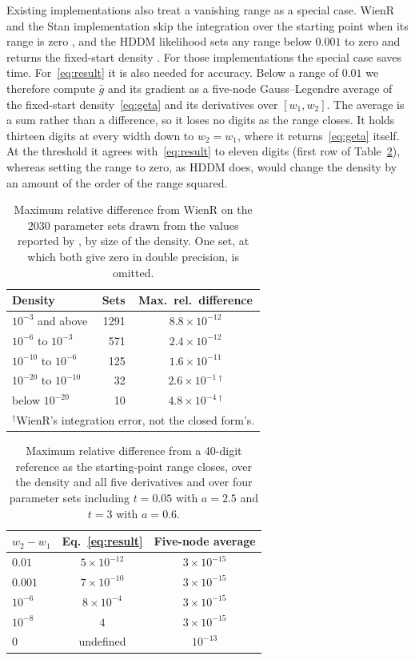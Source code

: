 \documentclass[final,5p,times,twocolumn,authoryear]{elsarticle}
\newcommand{\gbar}{\bar{g}}
\begin{document}
Existing implementations also treat a vanishing range as a special case. WienR and the Stan implementation skip the integration over the starting point when its range is zero \citep{HartmannKlauer2021, Henrich2024}, and the HDDM likelihood sets any range below $0.001$ to zero and returns the fixed-start density \citep{hddmwfpt}. For those implementations the special case saves time. For~\eqref{eq:result} it is also needed for accuracy. Below a range of $0.01$ we therefore compute $\gbar$ and its gradient as a five-node Gauss--Legendre average of the fixed-start density~\eqref{eq:geta} and its derivatives over $[w_1, w_2]$. The average is a sum rather than a difference, so it loses no digits as the range closes. It holds thirteen digits at every width down to $w_2 = w_1$, where it returns~\eqref{eq:geta} itself. At the threshold it agrees with~\eqref{eq:result} to eleven digits (first row of Table~\ref{tab:width}), whereas setting the range to zero, as HDDM does, would change the density by an amount of the order of the range squared.
\begin{table}[t]
\centering
\caption{Maximum relative difference from WienR on the 2030 parameter sets drawn from the values reported by \citet{tran2021systematic}, by size of the density. One set, at which both give zero in double precision, is omitted.}
\label{tab:bins}
\begin{tabular}{lrc}
\toprule
Density & Sets & Max.\ rel.\ difference \\
\midrule
$10^{-3}$ and above      & 1291 & $8.8\times10^{-12}$ \\
$10^{-6}$ to $10^{-3}$   &  571 & $2.4\times10^{-12}$ \\
$10^{-10}$ to $10^{-6}$  &  125 & $1.6\times10^{-11}$ \\
$10^{-20}$ to $10^{-10}$ &   32 & $2.6\times10^{-1}\,^{\dagger}$ \\
below $10^{-20}$         &   10 & $4.8\times10^{-4}\,^{\dagger}$ \\
\bottomrule
\multicolumn{3}{l}{$^{\dagger}$WienR's integration error, not the closed form's.}
\end{tabular}
\end{table}

\begin{table}[t]
\centering
\caption{Maximum relative difference from a 40-digit reference as the starting-point range closes, over the density and all five derivatives and over four parameter sets including $t = 0.05$ with $a = 2.5$ and $t = 3$ with $a = 0.6$.}
\label{tab:width}
\begin{tabular}{lcc}
\toprule
$w_2 - w_1$ & Eq.~\eqref{eq:result} & Five-node average \\
\midrule
$0.01$     & $5\times10^{-12}$ & $3\times10^{-15}$ \\
$0.001$    & $7\times10^{-10}$ & $3\times10^{-15}$ \\
$10^{-6}$  & $8\times10^{-4}$  & $3\times10^{-15}$ \\
$10^{-8}$  & $4$               & $3\times10^{-15}$ \\
$0$        & undefined         & $10^{-13}$ \\
\bottomrule
\end{tabular}
\end{table}
\end{document}
